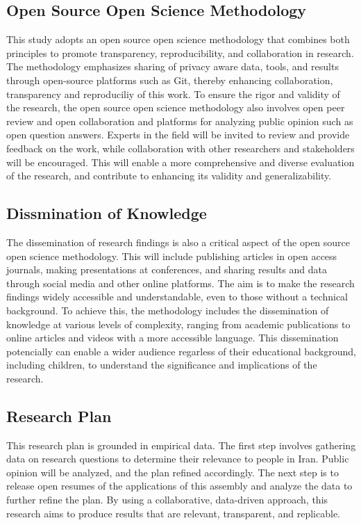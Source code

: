 \documentclass{IEEEtran}
\begin{document}
\subsection{Open Source Open Science Methodology}

This study adopts an open source open science methodology that combines both principles to promote transparency, reproducibility, and collaboration in research. The methodology emphasizes sharing of privacy aware data, tools, and results through open-source platforms such as Git, thereby enhancing collaboration, transparency and reproduciliy of this work.
To ensure the rigor and validity of the research, the open source open science methodology also involves open peer review and open collaboration and platforms for analyzing public opinion such as open question answers. Experts in the field will be invited to review and provide feedback on the work, while collaboration with other researchers and stakeholders will be encouraged. This will enable a more comprehensive and diverse evaluation of the research, and contribute to enhancing its validity and generalizability.

\subsection{Dissmination of Knowledge}
The dissemination of research findings is also a critical aspect of the open source open science methodology. This will include publishing articles in open access journals, making presentations at conferences, and sharing results and data through social media and other online platforms. The aim is to make the research findings widely accessible and understandable, even to those without a technical background.
To achieve this, the methodology includes the dissemination of knowledge at various levels of complexity, ranging from academic publications to online articles and videos with a more accessible language. This dissemination potencially can enable a wider audience regarless of their educational background, including children, to understand the significance and implications of the research.

\subsection{Research Plan}
This research plan is grounded in empirical data. The first step involves gathering data on research questions to determine their relevance to people in Iran. Public opinion will be analyzed, and the plan refined accordingly. The next step is to release open resumes of the applications of this assembly and analyze the data to further refine the plan.
By using a collaborative, data-driven approach, this research aims to produce results that are relevant, transparent, and replicable.
\end{document}

